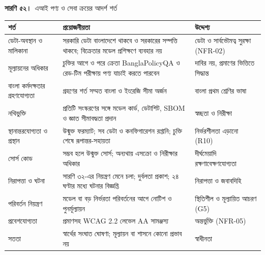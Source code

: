 \documentclass[border=10pt]{standalone}
\begin{document}
\begin{minipage}{17cm}
{\large\bfseries সারণি ৫২।}\ {\large এআই পণ্য ও সেবা ক্রয়ের আদর্শ শর্ত}\par\vspace{7pt}
\small
{}
\begin{tabularx}{\linewidth}{@{}>{\hsize=0.732\hsize\raggedright\arraybackslash}X>{\hsize=1.317\hsize\raggedright\arraybackslash}X>{\hsize=0.951\hsize\raggedright\arraybackslash}X@{}}
\arrayrulecolor{bapilrule}\toprule
\rowcolor{white}\textbf{শর্ত} & \textbf{প্রয়োজনীয়তা} & \textbf{উদ্দেশ্য} \\
\midrule
ডেটা-অবস্থান ও মালিকানা & সরকারি ডেটা বাংলাদেশে থাকবে ও সরকারের সম্পত্তি থাকবে; বিক্রেতার মডেল প্রশিক্ষণে ব্যবহার নয় & ডেটা ও সার্বভৌমত্ব সুরক্ষা (NFR-02) \\
মূল্যায়নের অধিকার & চুক্তির আগে ও পরে ক্রেতা BanglaPolicyQA ও রেড-টিম পরীক্ষায় পণ্য যাচাই করতে পারবেন & দাবির নয়, প্রমাণের ভিত্তিতে সিদ্ধান্ত \\
বাংলা কর্মদক্ষতার গ্রহণযোগ্যতা & গ্রহণের শর্ত সম্মত বাংলা ও ইংরেজি সীমা অর্জন & বাংলা প্রথম শ্রেণির ভাষা \\
নথিভুক্তি & প্রতিটি সংস্করণের সঙ্গে মডেল কার্ড, ডেটাশিট, SBOM ও জ্ঞাত সীমাবদ্ধতা প্রদান & স্বচ্ছতা ও নিরীক্ষা \\
স্থানান্তরযোগ্যতা ও প্রস্থান & উন্মুক্ত ফরম্যাট; সব ডেটা ও কনফিগারেশন রপ্তানি; চুক্তি শেষে রূপান্তর-সহায়তা & নির্ভরশীলতা এড়ানো (R10) \\
সোর্স কোড & সম্ভব হলে উন্মুক্ত সোর্স; অন্যথায় এসক্রো ও নিরীক্ষার অধিকার & দীর্ঘমেয়াদি রক্ষণাবেক্ষণযোগ্যতা \\
নিরাপত্তা ও ঘটনা & সারণি ৩২-এর নিয়ন্ত্রণ মেনে চলা; দুর্বলতা প্রকাশ; ২৪ ঘণ্টার মধ্যে ঘটনার বিজ্ঞপ্তি & নিরাপত্তা ও জবাবদিহি \\
পরিবর্তন নিয়ন্ত্রণ & মডেল বা বড় নির্ভরতা পরিবর্তনের আগে নোটিশ ও পুনর্মূল্যায়ন & স্থিতিশীল ও মূল্যায়িত আচরণ (G5) \\
প্রবেশযোগ্যতা & প্রমাণসহ WCAG 2.2 লেভেল AA সামঞ্জস্য & অন্তর্ভুক্তি (NFR-05) \\
সততা & স্বার্থের সংঘাত ঘোষণা; মূল্যায়ন বা শাসনে কোনো প্রভাব নয় & স্বাধীনতা \\
\bottomrule
\end{tabularx}
\par{}
\end{minipage}
\end{document}
